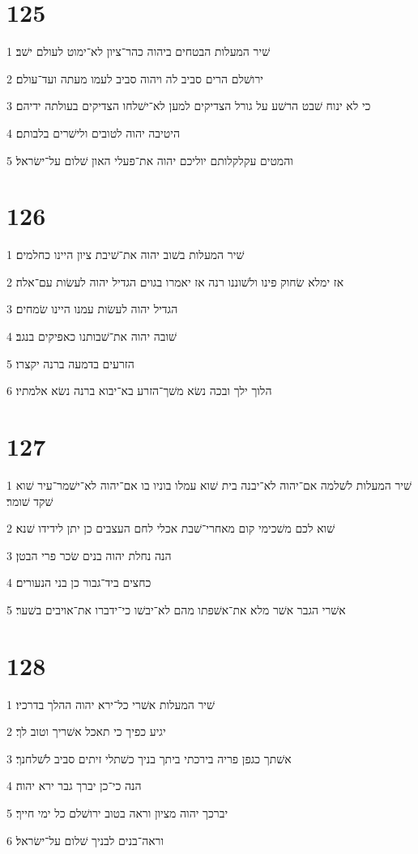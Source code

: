 \chapter{125}

\par 1 שׁיר המעלות הבטחים ביהוה כהר־ציון לא־ימוט לעולם ישׁב׃
\par 2 ירושׁלם הרים סביב לה ויהוה סביב לעמו מעתה ועד־עולם׃
\par 3 כי לא ינוח שׁבט הרשׁע על גורל הצדיקים למען לא־ישׁלחו הצדיקים בעולתה ידיהם׃
\par 4 היטיבה יהוה לטובים ולישׁרים בלבותם׃
\par 5 והמטים עקלקלותם יוליכם יהוה את־פעלי האון שׁלום על־ישׂראל׃

\chapter{126}

\par 1 שׁיר המעלות בשׁוב יהוה את־שׁיבת ציון היינו כחלמים׃
\par 2 אז ימלא שׂחוק פינו ולשׁוננו רנה אז יאמרו בגוים הגדיל יהוה לעשׂות עם־אלה׃
\par 3 הגדיל יהוה לעשׂות עמנו היינו שׂמחים׃
\par 4 שׁובה יהוה את־שׁבותנו כאפיקים בנגב׃
\par 5 הזרעים בדמעה ברנה יקצרו׃
\par 6 הלוך ילך ובכה נשׂא משׁך־הזרע בא־יבוא ברנה נשׂא אלמתיו׃

\chapter{127}

\par 1 שׁיר המעלות לשׁלמה אם־יהוה לא־יבנה בית שׁוא עמלו בוניו בו אם־יהוה לא־ישׁמר־עיר שׁוא שׁקד שׁומר׃
\par 2 שׁוא לכם משׁכימי קום מאחרי־שׁבת אכלי לחם העצבים כן יתן לידידו שׁנא׃
\par 3 הנה נחלת יהוה בנים שׂכר פרי הבטן׃
\par 4 כחצים ביד־גבור כן בני הנעורים׃
\par 5 אשׁרי הגבר אשׁר מלא את־אשׁפתו מהם לא־יבשׁו כי־ידברו את־אויבים בשׁער׃

\chapter{128}

\par 1 שׁיר המעלות אשׁרי כל־ירא יהוה ההלך בדרכיו׃
\par 2 יגיע כפיך כי תאכל אשׁריך וטוב לך׃
\par 3 אשׁתך כגפן פריה בירכתי ביתך בניך כשׁתלי זיתים סביב לשׁלחנך׃
\par 4 הנה כי־כן יברך גבר ירא יהוה׃
\par 5 יברכך יהוה מציון וראה בטוב ירושׁלם כל ימי חייך׃
\par 6 וראה־בנים לבניך שׁלום על־ישׂראל׃

